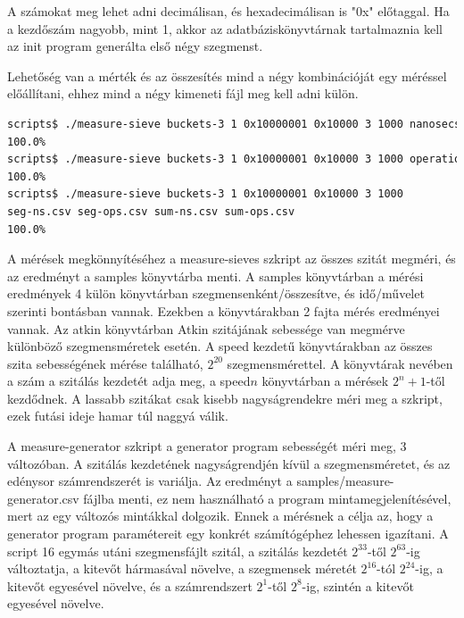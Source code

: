 A számokat meg lehet adni decimálisan, és hexadecimálisan is "0x" előtaggal.
Ha a kezdőszám nagyobb, mint 1, akkor az adatbáziskönyvtárnak tartalmaznia
kell az init program generálta első négy szegmenst.

Lehetőség van a mérték és az összesítés mind a négy kombinációját egy
méréssel előállítani, ehhez mind a négy kimeneti fájl meg kell adni külön.

\begin{lstlisting}[language=bash]
scripts$ ./measure-sieve buckets-3 1 0x10000001 0x10000 3 1000 nanosecs sum out1.csv
100.0%
scripts$ ./measure-sieve buckets-3 1 0x10000001 0x10000 3 1000 operations segment out2.csv
100.0%
scripts$ ./measure-sieve buckets-3 1 0x10000001 0x10000 3 1000
seg-ns.csv seg-ops.csv sum-ns.csv sum-ops.csv
100.0%
\end{lstlisting}

A mérések megkönnyítéséhez a measure-sieves szkript az összes szitát megméri, és az eredményt a samples könyvtárba menti.
A samples könyvtárban a mérési eredmények 4 külön könyvtárban szegmensenként/összesítve, és idő/művelet szerinti bontásban vannak.
Ezekben a könyvtárakban 2 fajta mérés eredményei vannak.
Az atkin könyvtárban Atkin szitájának sebessége van megmérve különböző szegmensméretek esetén.
A speed kezdetű könyvtárakban az összes szita sebességének mérése található, $2^{20}$ szegmensmérettel.
A könyvtárak nevében a szám a szitálás kezdetét adja meg, a speed$n$ könyvtárban a mérések $2^n+1$-től kezdődnek.
A lassabb szitákat csak kisebb nagyságrendekre méri meg a szkript, ezek futási ideje hamar túl naggyá válik.

A measure-generator szkript a generator program sebességét méri meg, 3 változóban.
A szitálás kezdetének nagyságrendjén kívül a szegmensméretet, és az edénysor számrendszerét is variálja.
Az eredményt a samples/measure-generator.csv fájlba menti, ez nem használható a program mintamegjelenítésével, mert az egy változós mintákkal dolgozik.
Ennek a mérésnek a célja az, hogy a generator program paramétereit egy konkrét számítógéphez lehessen
igazítani.
A script 16 egymás utáni szegmensfájlt szitál, a szitálás kezdetét $2^{33}$-től $2^{63}$-ig változtatja, a kitevőt hármasával növelve, a szegmensek méretét $2^{16}$-tól $2^{24}$-ig, a kitevőt egyesével növelve, és a számrendszert $2^1$-től $2^8$-ig, szintén a kitevőt egyesével növelve.

